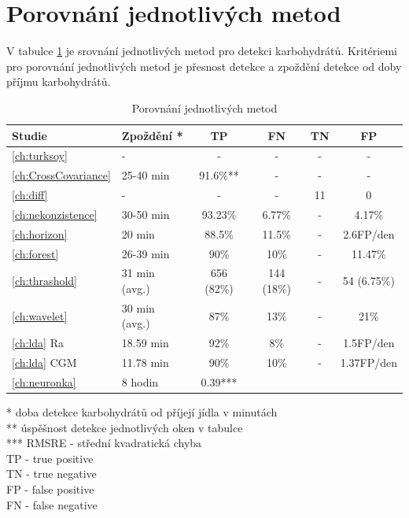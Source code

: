 \section{Porovnání jednotlivých metod}

V tabulce \ref{tab:res} je srovnání jednotlivých metod pro detekci karbohydrátů. Kritériemi pro porovnání jednotlivých metod je přesnost detekce a zpoždění detekce od doby příjmu karbohydrátů.

\begin{table}[H]
\caption{Porovnání jednotlivých metod}
\label{tab:res}
\centering
\begin{tabular}{|l|l|c|c|c|c|}
\hline 
\textbf{Studie} & \textbf{Zpoždění *} & \textbf{TP} & \textbf{FN} & \textbf{TN} & \textbf{FP}\tabularnewline
\hline 
\hline 
\ref{ch:turksoy} & - & - & - & - & -\tabularnewline
\hline 
\ref{ch:CrossCovariance} & 25-40 min & 91.6\%{**} & - & - & -\tabularnewline
\hline 
\ref{ch:diff} & - & - & - & 11 & 0\tabularnewline
\hline 
\ref{ch:nekonzistence} & 30-50 min & 93.23\% & 6.77\% & - & 4.17\%\tabularnewline
\hline
\ref{ch:horizon} & 20 min & 88.5\% & 11.5\% & - & 2.6FP/den\tabularnewline
\hline 
\ref{ch:forest} & 26-39 min & 90\% & 10\% & - & 11.47\%\tabularnewline
\hline 
\ref{ch:thrashold} & 31 min (avg.) & 656 (82\%) & 144 (18\%) & - & 54 (6.75\%)\tabularnewline
\hline 
\ref{ch:wavelet} & 30 min (avg.) & 87\% & 13\% & - & 21\%\tabularnewline
\hline 
\ref{ch:lda} Ra & 18.59 min & 92\% & 8\% & - & 1.5FP/den\tabularnewline
\hline 
\ref{ch:lda} CGM & 11.78 min & 90\% & 10\% & - & 1.37FP/den\tabularnewline
\hline
\ref{ch:neuronka} & 8 hodin & 0.39{***} & & & \tabularnewline
\hline
\end{tabular}
\begin{flushleft}
* doba detekce karbohydrátů od příjejí jídla v minutách\\
{**} úspěšnost detekce jednotlivých oken v tabulce\\
{***} RMSRE - střední kvadratická chyba\\
TP - true positive\\
TN - true negative\\
FP - false positive\\
FN - false negative\\
\end{flushleft}
\end{table}



